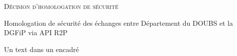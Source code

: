 \documentclass{article}
\begin{document}
\textsc{Décision d'homologation de sécurité}

\textcolor{bleu}{Homologation de sécurité des échanges entre Département du DOUBS et la DGFiP via API R2P}

  \begin{mdframed}[everyline=true, splitbottomskip = 10mm, splittopskip = 10mm, innertopmargin = 5mm]
  Un text dans un encadré
  \end{mdframed}
  \begin{tcolorbox}
  \end{tcolorbox}
\end{document}
